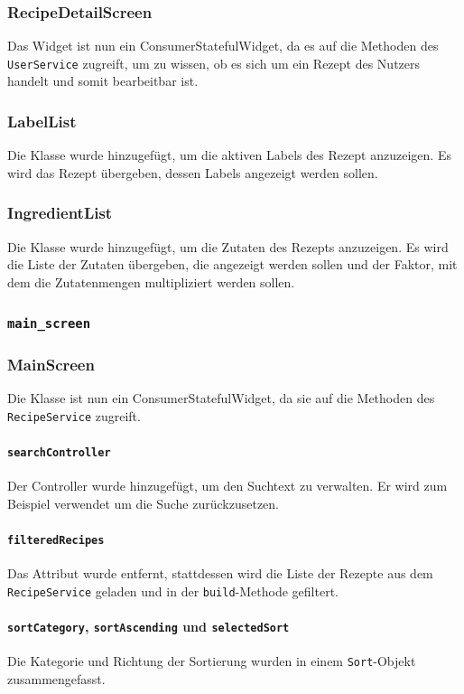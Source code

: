 \documentclass{implementierungsheft}
\begin{document}
\subsubsection*{RecipeDetailScreen}
Das Widget ist nun ein ConsumerStatefulWidget, da es auf die Methoden des \texttt{UserService} zugreift, um zu wissen, ob es sich um ein Rezept des Nutzers handelt und somit bearbeitbar ist.
\subsubsection*{LabelList}
Die Klasse wurde hinzugefügt, um die aktiven Labels des Rezept anzuzeigen. Es wird das Rezept übergeben, dessen Labels angezeigt werden sollen.
\subsubsection*{IngredientList}
Die Klasse wurde hinzugefügt, um die Zutaten des Rezepts anzuzeigen. Es wird die Liste der Zutaten übergeben, die angezeigt werden sollen und der Faktor, mit dem die Zutatenmengen multipliziert werden sollen.
\subsubsection{\texttt{main\_screen}}
\subsubsection*{MainScreen}
Die Klasse ist nun ein ConsumerStatefulWidget, da sie auf die Methoden des \texttt{RecipeService} zugreift.
\paragraph*{\texttt{searchController}}
Der Controller wurde hinzugefügt, um den Suchtext zu verwalten. Er wird zum Beispiel verwendet um die Suche zurückzusetzen.
\paragraph{\texttt{filteredRecipes}}
Das Attribut wurde entfernt, stattdessen wird die Liste der Rezepte aus dem \texttt{RecipeService} geladen und in der \texttt{build}-Methode gefiltert.
\paragraph{\texttt{sortCategory}, \texttt{sortAscending} und \texttt{selectedSort}} Die Kategorie und Richtung der Sortierung wurden in einem \texttt{Sort}-Objekt zusammengefasst.
\end{document}

